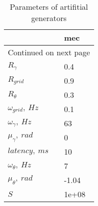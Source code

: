 \begin{longtable}{ll}
\caption{Parameters of artifitial generators}\label{ArtifitialGridCell_parameters}\\
\toprule
{} &    mec \\
\midrule
\endhead
\midrule
\multicolumn{2}{r}{{Continued on next page}} \\
\midrule
\endfoot

\bottomrule
\endlastfoot
$R_{\gamma}$     &    0.4 \\
$R_{grid}$      &    0.9 \\
$R_{\theta}$     &    0.3 \\
$\omega_{grid},\ Hz$ &    0.1 \\
$\omega_{\gamma},\ Hz$ &     63 \\
$\mu_{\gamma},\ rad$    &      0 \\
$latency,\ ms$    &     10 \\
$\omega_{\theta},\ Hz$  &      7 \\
$\mu_{\theta},\ rad$     &  -1.04 \\
$S$ &  1e+08 \\
\end{longtable}
